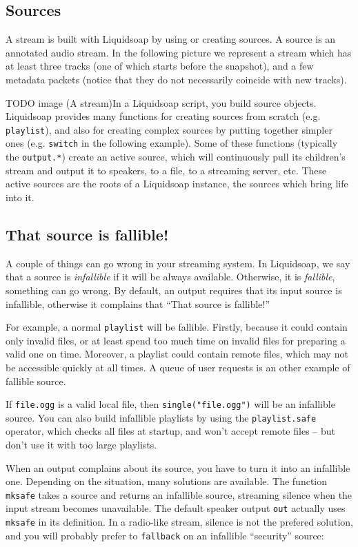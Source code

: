 \subsection{Sources}
A stream is built with Liquidsoap by using or creating sources. A source is an
annotated audio stream. In the following picture we represent a stream which has
at least three tracks (one of which starts before the snapshot), and a few
metadata packets (notice that they do not necessarily coincide with new tracks).

TODO image (A stream)In a Liquidsoap script, you build source
objects. Liquidsoap provides many functions for creating sources from scratch
(e.g. \verb+playlist+), and also for creating complex sources by putting
together simpler ones (e.g. \verb+switch+ in the following example). Some of
these functions (typically the \verb+output.*+) create an active source, which
will continuously pull its children's stream and output it to speakers, to a
file, to a streaming server, etc. These active sources are the roots of a
Liquidsoap instance, the sources which bring life into it.

\subsection{That source is fallible!}
A couple of things can go wrong in your streaming system.  In Liquidsoap, we say
that a source is \emph{infallible} if it will be always available.  Otherwise,
it is \emph{fallible}, something can go wrong.  By default, an output requires
that its input source is infallible, otherwise it complains that ``That source
is fallible!''

For example, a normal \verb+playlist+ will be fallible.  Firstly, because it
could contain only invalid files, or at least spend too much time on invalid
files for preparing a valid one on time.  Moreover, a playlist could contain
remote files, which may not be accessible quickly at all times.  A queue of user
requests is an other example of fallible source.

If \verb+file.ogg+ is a valid local file, then \verb+single("file.ogg")+ will be
an infallible source.  You can also build infallible playlists by using the
\verb+playlist.safe+ operator, which checks all files at startup, and won't
accept remote files -- but don't use it with too large playlists.

When an output complains about its source, you have to turn it into an
infallible one. Depending on the situation, many solutions are available. The
function \verb+mksafe+ takes a source and returns an infallible source,
streaming silence when the input stream becomes unavailable.  The default
speaker output \verb+out+ actually uses \verb+mksafe+ in its definition. In a
radio-like stream, silence is not the prefered solution, and you will probably
prefer to \verb+fallback+ on an infallible ``security'' source:

